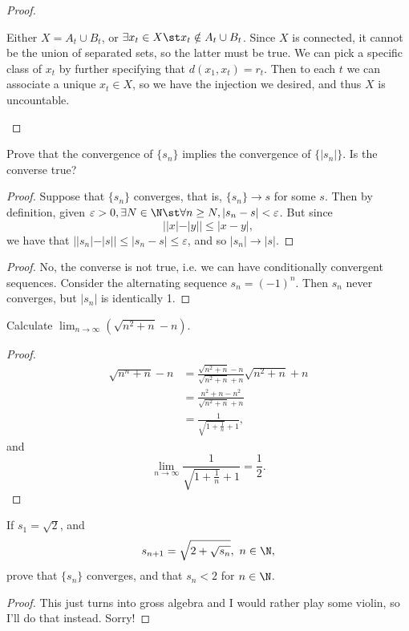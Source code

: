 \documentclass{assignment}
\begin{document}
\begin{proof}
\begin{qparts}
    Either $X = A_t \cup B_t$, or $\exists x_t \in X \st x_t \notin A_t \cup B_t$. Since $X$ is connected,
    it cannot be the union of separated sets, so the latter must be true. We can pick a specific
    class of $x_t$ by further specifying that $d(x_1, x_t) = r_t$. Then to each $t$ we can associate
    a unique $x_t\in X$, so we have the injection we desired, and thus $X$ is uncountable.  
  \end{qparts} 
\end{proof}

\newpage
\begin{question}[3.1]
  Prove that the convergence of $\{s_n\}$ implies the convergence of $\{|s_n|\}$. Is the converse
  true?
\end{question}
\begin{proof}
  Suppose that $\{s_n\}$ converges, that is, $\{s_n\} \to s$ for some $s$. Then by definition, given
  $\varepsilon > 0, \exists N\in\N \st \forall n \geq N, |s_n - s| < \varepsilon$. But since 
  $$||x| - |y|| \leq |x - y|,$$ we have that $||s_n| - |s|| \leq |s_n - s| \leq \varepsilon$, and so
  $|s_n| \to |s|$.
\end{proof}
\begin{proof}
  No, the converse is not true, i.e. we can have conditionally convergent sequences. Consider the
alternating sequence $s_n = (-1)^n$. Then $s_n$ never converges, but $|s_n|$ is identically 1.
\end{proof}

\begin{question}[3.2]
  Calculate $\lim_{n\to\infty}(\sqrt{n^2 + n} - n)$.
\end{question}
\begin{proof}
  \begin{align*}
    \sqrt{n^n + n} - n &= \frac{\sqrt{n^2 + n} - n}{\sqrt{n^2 + n} + n}\sqrt{n^2 + n} + n \\
                       &= \frac{n^2 + n - n^2}{\sqrt{n^2 + n} + n} \\
                       &= \frac{1}{\sqrt{1 + \frac{1}{n}} + 1},
  \end{align*}
  and $$\lim_{n\to\infty} \frac{1}{\sqrt{1 + \frac{1}{n}} + 1} = \frac{1}{2}.$$
\end{proof}

\begin{question}[3.3]
  If $s_1 = \sqrt{2}$, and $$s_{n+1} = \sqrt{2 + \sqrt{s_n}},\ n\in\N,$$ prove that $\{s_n\}$ converges,
  and that $s_n < 2$ for $n\in\N$.
\end{question}
\begin{proof}
 This just turns into gross algebra and I would rather play some violin, so I'll do that instead. Sorry! 
\end{proof}
\end{document}
